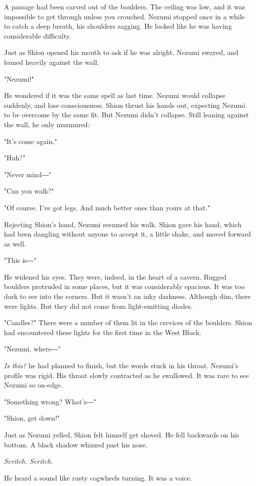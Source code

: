 A passage had been carved out of the boulders. The ceiling was low, and
it was impossible to get through unless you crouched. Nezumi stopped
once in a while to catch a deep breath, his shoulders sagging. He looked
like he was having considerable difficulty.

Just as Shion opened his mouth to ask if he was alright, Nezumi swayed,
and leaned heavily against the wall.

"Nezumi!"

He wondered if it was the same spell as last time. Nezumi would collapse
suddenly, and lose consciousness. Shion thrust his hands out, expecting
Nezumi to be overcome by the same fit. But Nezumi didn't collapse. Still
leaning against the wall, he only murmured:

"It's come again."

"Huh?"

"Never mind―"

"Can you walk?"

"Of course. I've got legs. And much better ones than yours at that."

Rejecting Shion's hand, Nezumi resumed his walk. Shion gave his hand,
which had been dangling without anyone to accept it, a little shake, and
moved forward as well.

"This is―"

He widened his eyes. They were, indeed, in the heart of a cavern. Rugged
boulders protruded in some places, but it was considerably spacious. It
was too dark to see into the corners. But it wasn't an inky darkness.
Although dim, there were lights. But they did not come from
light-emitting diodes.

"Candles?" There were a number of them lit in the crevices of the
boulders. Shion had encountered these lights for the first time in the
West Block.

"Nezumi, where―"

\emph{Is this?} he had planned to finish, but the words stuck in his throat.
Nezumi's profile was rigid. His throat slowly contracted as he
swallowed. It was rare to see Nezumi so on-edge.

"Something wrong? What's―"

"Shion, get down!"

Just as Nezumi yelled, Shion felt himself get shoved. He fell backwards
on his bottom. A black shadow whizzed past his nose.

\emph{Scritch. Scritch.}

He heard a sound like rusty cogwheels turning. It was a voice.

